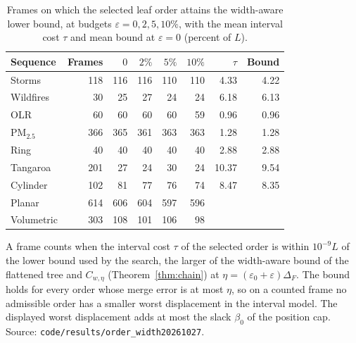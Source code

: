 \begin{table}[H]
\centering\small\setlength{\tabcolsep}{3.2pt}
\caption{Frames on which the selected leaf order attains the width-aware lower bound, at budgets $\varepsilon=0,2,5,10\%$, with the mean interval cost $\tau$ and mean bound at $\varepsilon=0$ (percent of $L$).}\label{tab:supp_bound_attainment}
\begin{tabular}{lrrrrrrr}\toprule
Sequence & Frames & $0$ & $2\%$ & $5\%$ & $10\%$ & $\tau$ & Bound\\\midrule
Storms & 118 & 116 & 116 & 110 & 110 & 4.33 & 4.22\\
Wildfires & 30 & 25 & 27 & 24 & 24 & 6.18 & 6.13\\
OLR & 60 & 60 & 60 & 60 & 59 & 0.96 & 0.96\\
PM$_{2.5}$ & 366 & 365 & 361 & 363 & 363 & 1.28 & 1.28\\
Ring & 40 & 40 & 40 & 40 & 40 & 2.88 & 2.88\\
Tangaroa & 201 & 27 & 24 & 30 & 24 & 10.37 & 9.54\\
Cylinder & 102 & 81 & 77 & 76 & 74 & 8.47 & 8.35\\
\midrule Planar & 614 & 606 & 604 & 597 & 596 &  & \\
Volumetric & 303 & 108 & 101 & 106 & 98 &  & \\
\bottomrule\end{tabular}
\par\smallskip\parbox{\linewidth}{\footnotesize A frame counts when the interval cost $\tau$ of the selected order is within $10^{-9}L$ of the lower bound used by the search, the larger of the width-aware bound of the flattened tree and $C_{w,\eta}$ (Theorem~\ref{thm:chain}) at $\eta=(\varepsilon_0+\varepsilon)\Delta_F$. The bound holds for every order whose merge error is at most $\eta$, so on a counted frame no admissible order has a smaller worst displacement in the interval model. The displayed worst displacement adds at most the slack $\beta_0$ of the position cap. Source: \texttt{code/results/order\_width20261027}.}
\end{table}

